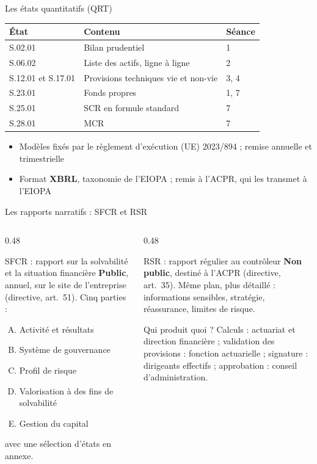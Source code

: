 \documentclass[10pt,aspectratio=169]{beamer}
\begin{document}
\begin{frame}{Les états quantitatifs (QRT)}
\begin{table}
\centering
\small
\renewcommand{\arraystretch}{1.3}
\begin{tabular}{lll}
\toprule
\textbf{État} & \textbf{Contenu} & \textbf{Séance} \\
\midrule
S.02.01 & Bilan prudentiel & 1 \\
S.06.02 & Liste des actifs, ligne à ligne & 2 \\
S.12.01 et S.17.01 & Provisions techniques vie et non-vie & 3, 4 \\
S.23.01 & Fonds propres & 1, 7 \\
S.25.01 & SCR en formule standard & 7 \\
S.28.01 & MCR & 7 \\
\bottomrule
\end{tabular}
\end{table}
\begin{itemize}
  \item Modèles fixés par le règlement d'exécution (UE) 2023/894 ; remise annuelle et trimestrielle
  \item Format \textbf{XBRL}, taxonomie de l'EIOPA ; remis à l'ACPR, qui les transmet à l'EIOPA
\end{itemize}
\end{frame}

\begin{frame}{Les rapports narratifs : SFCR et RSR}
\begin{columns}[T]
\begin{column}{0.48\textwidth}
\begin{block}{SFCR : rapport sur la solvabilité et la situation financière}
\small
\textbf{Public}, annuel, sur le site de l'entreprise (directive, art.~51). Cinq parties :
\begin{enumerate}[A.]
  \item Activité et résultats
  \item Système de gouvernance
  \item Profil de risque
  \item Valorisation à des fins de solvabilité
  \item Gestion du capital
\end{enumerate}
avec une sélection d'états en annexe.
\end{block}
\end{column}
\begin{column}{0.48\textwidth}
\begin{block}{RSR : rapport régulier au contrôleur}
\small
\textbf{Non public}, destiné à l'ACPR (directive, art.~35). Même plan, plus détaillé :
informations sensibles, stratégie, réassurance, limites de risque.
\end{block}
\begin{alertblock}{Qui produit quoi ?}
\small
Calculs : actuariat et direction financière ; validation des provisions : fonction actuarielle ;
signature : dirigeants effectifs ; approbation : conseil d'administration.
\end{alertblock}
\end{column}
\end{columns}
\end{frame}
\end{document}
